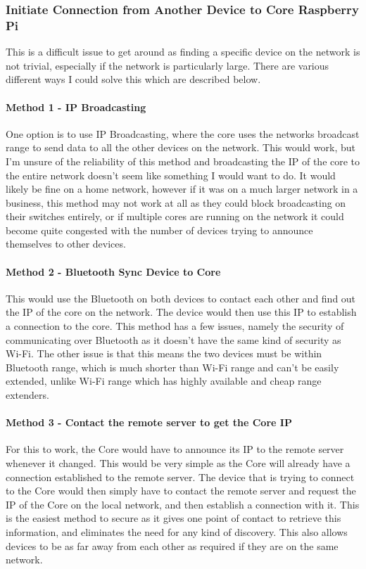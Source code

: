 \subsubsection{Initiate Connection from Another Device to Core Raspberry Pi}
This is a difficult issue to get around as finding a specific device on the network is not trivial, especially if the network is particularly large. There are various different ways I could solve this which are described below.

\paragraph{Method 1 - IP Broadcasting} One option is to use IP Broadcasting, where the core uses the networks broadcast range to send data to all the other devices on the network. This would work, but I'm unsure of the reliability of this method and broadcasting the IP of the core to the entire network doesn't seem like something I would want to do. It would likely be fine on a home network, however if it was on a much larger network in a business, this method may not work at all as they could block broadcasting on their switches entirely, or if multiple cores are running on the network it could become quite congested with the number of devices trying to announce themselves to other devices.

\paragraph{Method 2 - Bluetooth Sync Device to Core} This would use the Bluetooth on both devices to contact each other and find out the IP of the core on the network. The device would then use this IP to establish a connection to the core. This method has a few issues, namely the security of communicating over Bluetooth as it doesn't have the same kind of security as Wi-Fi. The other issue is that this means the two devices must be within Bluetooth range, which is much shorter than Wi-Fi range and can't be easily extended, unlike Wi-Fi range which has highly available and cheap range extenders.

\paragraph{Method 3 - Contact the remote server to get the Core IP} For this to work, the Core would have to announce its IP to the remote server whenever it changed. This would be very simple as the Core will already have a connection established to the remote server. The device that is trying to connect to the Core would then simply have to contact the remote server and request the IP of the Core on the local network, and then establish a connection with it. This is the easiest method to secure as it gives one point of contact to retrieve this information, and eliminates the need for any kind of discovery. This also allows devices to be as far away from each other as required if they are on the same network.

